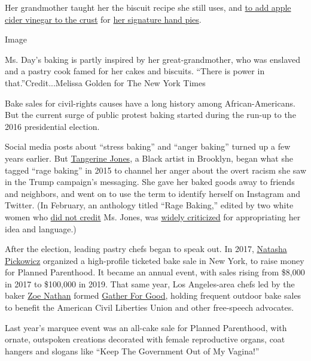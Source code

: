 Her grandmother taught her the biscuit recipe she still uses, and
\href{https://cooking.nytimes3xbfgragh.onion/recipes/1021241-extra-flaky-pie-crust}{to
add apple cider vinegar to the crust} for
\href{https://cooking.nytimes3xbfgragh.onion/recipes/1021240-berry-hand-pies}{her
signature hand pies}.

Image

Ms. Day's baking is partly inspired by her great-grandmother, who was
enslaved and a pastry cook famed for her cakes and biscuits. ``There is
power in that.''Credit...Melissa Golden for The New York Times

Bake sales for civil-rights causes have a long history among
African-Americans. But the current surge of public protest baking
started during the run-up to the 2016 presidential election.

Social media posts about ``stress baking'' and ``anger baking'' turned
up a few years earlier. But
\href{https://twitter.com/tangerinejones}{Tangerine Jones}, a Black
artist in Brooklyn, began what she tagged ``rage baking'' in 2015 to
channel her anger about the overt racism she saw in the Trump campaign's
messaging. She gave her baked goods away to friends and neighbors, and
went on to use the term to identify herself on Instagram and Twitter.
(In February, an anthology titled ``Rage Baking,'' edited by two white
women who
\href{https://medium.com/@tangerinejones/the-privilege-of-rage-e5b2cb53d238}{did
not credit} Ms. Jones, was
\href{https://www.nytimes3xbfgragh.onion/2020/02/21/dining/rage-baking-book-tangerine-jones.html}{widely
criticized} for appropriating her idea and language.)

After the election, leading pastry chefs began to speak out. In 2017,
\href{https://www.instagram.com/natashapickowicz/?hl=en}{Natasha
Pickowicz} organized a high-profile ticketed bake sale in New York, to
raise money for Planned Parenthood. It became an annual event, with
sales rising from \$8,000 in 2017 to \$100,000 in 2019. That same year,
Los Angeles-area chefs led by the baker
\href{https://www.huckleberrycafe.com/our-story/}{Zoe Nathan} formed
\href{https://www.andgatherforgood.com/new-page}{Gather For Good},
holding frequent outdoor bake sales to benefit the American Civil
Liberties Union and other free-speech advocates.

Last year's marquee event was an all-cake sale for Planned Parenthood,
with ornate, outspoken creations decorated with female reproductive
organs, coat hangers and slogans like ``Keep The Government Out of My
Vagina!''

